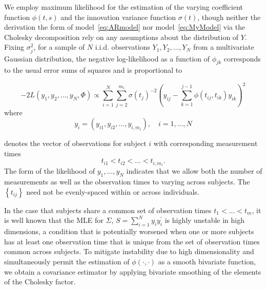 \documentclass[12pt]{article}
\theoremstyle{definition}
\begin{document}
We employ maximum likelihood  for the estimation of  the varying coefficient function $\phi\left(t,s\right)$ and the innovation variance function $\sigma\left(t\right)$, though neither the derivation the form of model~\ref{eq:ARmodel} nor model~\ref{eq:MyModel} via the Cholesky decomposition rely on any assumptions about the distribution of $Y$. Fixing $\sigma_j^2$,  for a sample of $N$  i.i.d. observations $Y_1,Y_2,\dots,Y_N$ from a multivariate Gaussian distribution, the negative log-likelihood as a function of $\phi_{jk}$ corresponds to the usual error sums of squares and is proportional to

\begin{equation}
-2 L\left(y_1, y_2, \dots,y_N ,\Phi \right) \propto \sum_{i=1}^N \sum_{j=2}^{m_i} \sigma\left({t_j}\right)^{-2} \left(y_{ij} - \sum_{k=1}^{j-1}\phi\left({t_{ij},t_{ik}}\right)y_{ik} \right)^2 \label{loglikelihood}
\end{equation}
\noindent
where 
\[
y_i = \left( y_{i1}, y_{i2}, \dots, y_{i,m_i}\right), \quad i=1,\dots,N 
\] 

\noindent
denotes the vector of observations for subject $i$ with corresponding measurement times 
\[
t_{i1} < t_{i2} < \dots < t_{i,m_i}.
\]
The form of the likelihood of $y_1,\dots,y_N$ indicates that we allow both the number of measurements as well as the observation times to varying across subjects. The $\left\{t_{ij} \right\}$ need not be evenly-spaced within or across individuals.  

In the case that subjects share a common set of observation times $t_1 < \dots < t_m$,  it is well known that the MLE for $\Sigma$, $S = \sum_{i=1}^N y_i y_i^\prime$ is highly unstable in high dimensions, a condition that is potentially worsened when one or more subjects has at least one observation time that is unique from the set of observation times common across subjects. To mitigate instability due to high dimensionality and simultaneously permit the estimation of $\phi\left(\cdot,\cdot\right)$ as a smooth bivariate function, we obtain a covariance estimator by applying bivariate smoothing of the elements of the Cholesky factor. 
\end{document}
